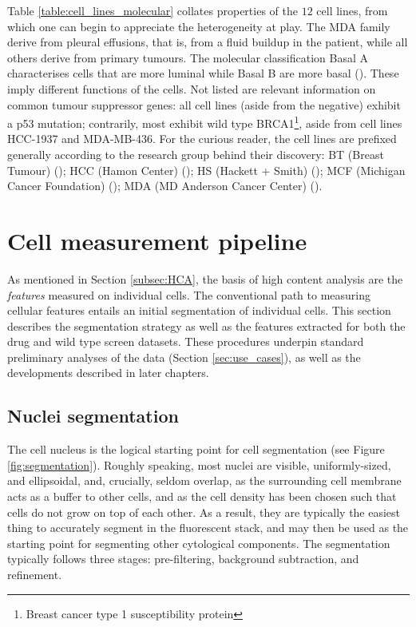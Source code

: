 Table \ref{table:cell_lines_molecular} collates properties of the $12$ cell lines, from which one can begin to appreciate the heterogeneity at play. The MDA family derive from pleural effusions, that is, from a fluid buildup in the patient, while all others derive from primary tumours. The molecular classification Basal A characterises cells that are more luminal while Basal B are more basal (\cite{dai2017breast}). These imply different functions of the cells. Not listed are relevant information on common tumour suppressor genes: all cell lines (aside from the negative) exhibit a p53 mutation; contrarily, most exhibit wild type BRCA1\footnote{Breast cancer type 1 susceptibility protein}, aside from cell lines HCC-1937 and MDA-MB-436. For the curious reader, the cell lines are prefixed generally according to the research group behind their discovery: BT (Breast Tumour) (\cite{lasfargues1958cultivation}); HCC (Hamon Center) (\cite{gazdar1998characterization}); HS (Hackett + Smith) (\cite{hackett1977two}); MCF (Michigan Cancer Foundation) (\cite{soule1990isolation}); MDA (MD Anderson Cancer Center) (\cite{brinkley1980variations}).

\section{Cell measurement pipeline}
\label{sec:cell_measurement}

As mentioned in Section \ref{subsec:HCA}, the basis of high content analysis are the \emph{features} measured on individual cells. The conventional path to measuring cellular features entails an initial segmentation of individual cells. This section describes the segmentation strategy as well as the features extracted for both the drug and wild type screen datasets. These procedures underpin standard preliminary analyses of the data (Section \ref{sec:use_cases}), as well as the developments described in later chapters.


\subsection{Nuclei segmentation}

The cell nucleus is the logical starting point for cell segmentation (see Figure \ref{fig:segmentation}). Roughly speaking, most nuclei are visible, uniformly-sized, and ellipsoidal, and, crucially, seldom overlap, as the surrounding cell membrane acts as a buffer to other cells, and as the cell density has been chosen such that cells do not grow on top of each other. As a result, they are typically the easiest thing to accurately segment in the fluorescent stack, and may then be used as the starting point for segmenting other cytological components. The segmentation typically follows three stages: pre-filtering, background subtraction, and refinement.

